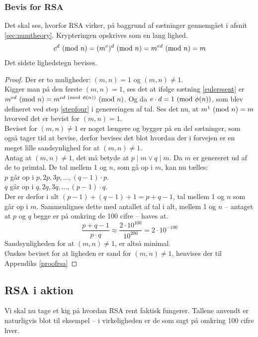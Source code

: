 \subsubsection{Bevis for RSA}
Det skal ses, hvorfor RSA virker, på baggrund af sætninger gennemgået i afsnit \ref{sec:numtheory}.
Krypteringen opskrives som en lang lighed.\cite[83]{ruc}
\[c^d \ (\mathrm{mod}\ n) = (m^e)^d \ (\mathrm{mod}\ n) = m^{ed} \ (\mathrm{mod}\ n) = m\]
Det sidste lighedstegn bevises.
\begin{proof}
        Der er to muligheder: \((m, n) = 1\) og \((m, n) \neq 1\).\\
        Kigger man på den første \((m, n) = 1\), ses det at ifølge sætning \ref{eulerssent} er \(m^{ed} \ (\mathrm{mod}\ n) = m^{ed \ (\mathrm{mod}\ \phi(n))} \ (\mathrm{mod}\ n)\).
        Og da \(e \cdot d = 1 \ (\mathrm{mod}\ \phi(n))\), som blev defineret ved step \ref{stepfour} i genereringen af tal.
        Ses det nu, at \(m^1 \ (\mathrm{mod}\ n) = m\) hvorved det er bevist for \((m, n) = 1\).\\
        Beviset for \((m, n) \neq 1\) er noget længere og bygger på en del sætninger, som også tager tid at bevise, derfor bevises det blot hvordan der i forvejen er en meget lille sandsynlighed for at \((m, n) \neq 1\).\\
        Antag at \((m, n) \neq 1\), det må betyde at \(p \mid m \lor q \mid m\). Da \(m\) er genereret ud af de to primtal.
        De tal mellem 1 og \(n\), som gå op i \(m\), kan nu tælles:\\
        \(p\) går op i \(p, 2p, 3p, \hdots , (q - 1) \cdot p\).\\
        \(q\) går op i \(q, 2q, 3q, \hdots , (p - 1) \cdot q\).\\
        Der er derfor i alt \((p - 1) + (q - 1) + 1 = p + q - 1\), tal mellem 1 og \(n\) som går op i \(m\).
        Sammenlignes dette med antallet af tal i alt, mellem 1 og \(n\) -- antaget at \(p\) og \(q\) begge er på omkring de 100 cifre -- haves at.
        \[\frac{p + q - 1}{p \cdot q} \approx \frac{2 \cdot 10^{100}}{10^{200}} = 2 \cdot 10^{-100}\]
        Sandsynligheden for at \((m, n) \neq 1\), er altså minimal.\cite[106]{krypto}\\
        Ønskes beviset for at ligheden er sand for \((m, n) \neq 1\), henvises der til Appendiks \ref{proofrsa}
\end{proof}


\subsection{RSA i aktion}
Vi skal nu tage et kig på hvordan RSA rent faktisk fungerer.
Tallene anvendt er naturligvis blot til eksempel -- i virkeligheden er de som sagt på omkring 100 cifre hver.

